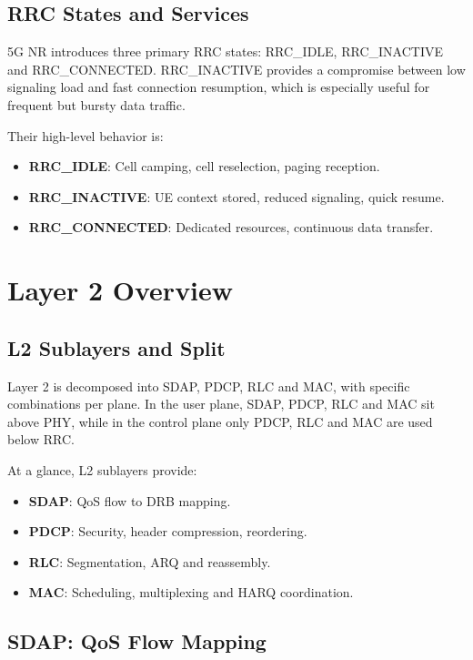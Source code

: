 \documentclass[12pt,a4paper]{article}
\begin{document}
\subsection{RRC States and Services}

5G NR introduces three primary RRC states: RRC\_IDLE, RRC\_INACTIVE and RRC\_CONNECTED. RRC\_INACTIVE provides a compromise between low signaling load and fast connection resumption, which is especially useful for frequent but bursty data traffic.

Their high-level behavior is:
\begin{itemize}
  \item \textbf{RRC\_IDLE}: Cell camping, cell reselection, paging reception.
  \item \textbf{RRC\_INACTIVE}: UE context stored, reduced signaling, quick resume.
  \item \textbf{RRC\_CONNECTED}: Dedicated resources, continuous data transfer.
\end{itemize}

\section{Layer 2 Overview}

\subsection{L2 Sublayers and Split}

Layer 2 is decomposed into SDAP, PDCP, RLC and MAC, with specific combinations per plane. In the user plane, SDAP, PDCP, RLC and MAC sit above PHY, while in the control plane only PDCP, RLC and MAC are used below RRC.

At a glance, L2 sublayers provide:
\begin{itemize}
  \item \textbf{SDAP}: QoS flow to DRB mapping.
  \item \textbf{PDCP}: Security, header compression, reordering.
  \item \textbf{RLC}: Segmentation, ARQ and reassembly.
  \item \textbf{MAC}: Scheduling, multiplexing and HARQ coordination.
\end{itemize}

\subsection{SDAP: QoS Flow Mapping}
\end{document}
